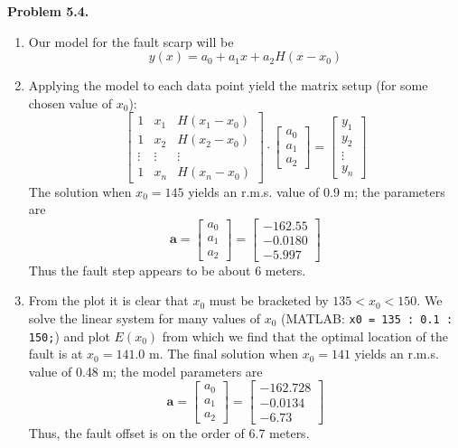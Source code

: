 \noindent
\bf{Problem 5.4.} \\
\begin{enumerate}[label=\alph*)]

\item Our model for the fault scarp will be
$$
y(x) = a_0 + a_1 x + a_2 H(x-x_0)
$$
\item Applying the model to each data point yield the matrix setup (for some chosen value of $x_0$):
$$
\left [ \begin{array}{ccc}
1 & x_1 & H(x_1 - x_0) \\
1 & x_2 & H(x_2 - x_0) \\
\vdots & \vdots & \vdots \\
1 & x_n & H(x_n - x_0)
\end{array} \right ] \cdot \left [
\begin{array}{c}
a_0 \\
a_1 \\
a_2
\end{array} \right ] = \left [
\begin{array}{c}
y_1 \\
y_2 \\
\vdots \\
y_n
\end{array} \right ]
$$
The solution when $x_0 = 145$ yields an r.m.s. value of 0.9 m; the parameters are
$$
\mathbf{a} =  \left [
\begin{array}{c}
a_0 \\
a_1 \\
a_2
\end{array} \right ]
=  \left [
\begin{array}{r}
-162.55 \\
 -0.0180 \\
 -5.997
\end{array} \right ]
$$
Thus the fault step appears to be about 6 meters.
\item From the plot it is clear that $x_0$ must be bracketed by $135 < x_0 < 150$.  We solve the
linear system for many values of $x_0$ (MATLAB: \texttt{x0 = 135 : 0.1 : 150;}) and plot
$E(x_0)$ from which we find that the optimal location of the fault
is at $x_0 = 141.0$ m.  The final solution when $x_0 = 141$ yields an r.m.s. value of 0.48 m;
the model parameters are
$$
\mathbf{a} =  \left [
\begin{array}{c}
a_0 \\
a_1 \\
a_2
\end{array} \right ]
=  \left [
\begin{array}{r}
-162.728 \\
 -0.0134 \\
 -6.73
\end{array} \right ]
$$
Thus, the fault offset is on the order of 6.7 meters.
\end{enumerate}

